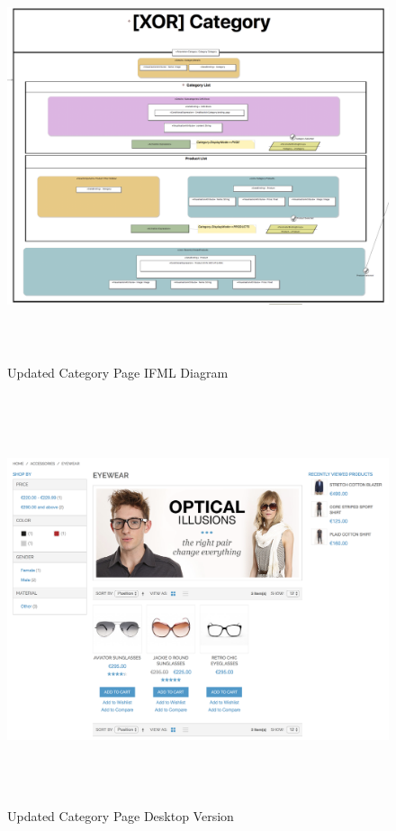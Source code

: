\vspace{0.5cm}
\begin{figure}[H]
  \centering
    \includegraphics[height=12cm]{images/diagrams/after/ifml-category.png}
  \caption{Updated Category Page IFML Diagram}
  \label{fig:ifml-after-category}
\end{figure}

\begin{figure}[H]
  \centering
    \includegraphics[height=12cm]{images/diagrams/after/desktop-category.png}
  \caption{Updated Category Page Desktop Version}
  \label{fig:desktop-after-category}
\end{figure}
\vspace{0.5cm}

